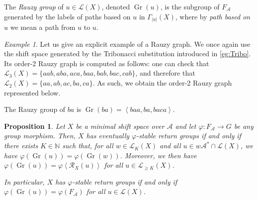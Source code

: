 \documentclass{amsart}
\newcommand*{\nn}{\mathbb{N}}
\newcommand*{\ret}{\mathcal{R}}
\newcommand*{\lang}{\mathcal{L}}
\newcommand*{\cA}{\mathcal{A}}
\newcommand*{\from}{\colon}
\newcommand*{\Gr}{\operatorname{Gr}}
\newcommand*{\RauzyGraph}{\Gamma}
\newcommand*{\gen}[1]{\left\langle #1\right\rangle}
\theoremstyle{plain}
\newtheorem{proposition}[theorem]{Proposition}
\theoremstyle{definition}
\theoremstyle{remark}
\newtheorem{example}[theorem]{Example}
\begin{document}
The \emph{Rauzy group} of $u \in \lang(X)$, denoted $\Gr(u)$, is the subgroup of $F_\cA$ generated by the labels of paths based on $u$ in $\RauzyGraph_{|u|}(X)$, where by {\em path based on $u$} we mean a path from $u$ to $u$.

\begin{example}
    Let us give an explicit example of a Rauzy graph. We once again use the shift space generated by the Tribonacci substitution introduced in \cref{eg:Tribo}. Its order-2 Rauzy graph is computed as follows: one can check that $\lang_3(X) = \{aab,aba,aca,baa,bab,bac,cab\}$, and therefore that $\lang_2(X) = \{aa,ab,ac,ba,ca\}$. As such, we obtain the order-2 Rauzy graph represented below. 
    \begin{center}
    \end{center}
    The Rauzy group of $ba$ is $\Gr(ba) = \gen{baa,ba,baca}$. 
\end{example}

\begin{proposition}\label{P:equivalence with Rauzy groups}
    Let $X$ be a minimal shift space over $\cA$ and let $\varphi\from F_\cA\to G$ be any group morphism. Then, $X$ has eventually $\varphi$-stable return groups if and only if there exists $K \in\nn$ such that, for all $w \in \lang_{K}(X)$ and all $u \in w\cA^* \cap \lang(X)$, we have $\varphi(\Gr(u)) = \varphi(\Gr(w))$. Moreover, we then have $\varphi(\Gr(u)) = \varphi\gen{\ret_X(u)}$ for all $u \in \lang_{\geq K}(X)$.

    In particular, $X$ has $\varphi$-stable return groups if and only if $\varphi(\Gr(u)) = \varphi(F_\cA)$ for all $u \in \lang(X)$.
\end{proposition}
\end{document}
